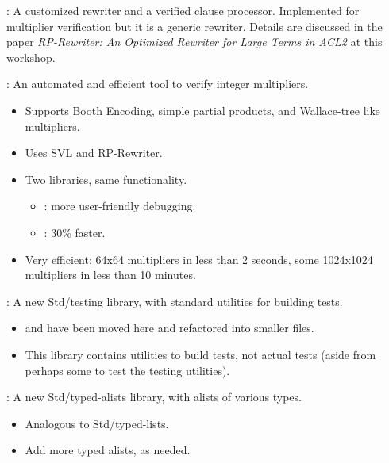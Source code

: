 
\begin{frame}

\newlibtitle

:
A customized rewriter and a verified
clause processor. Implemented for multiplier verification but it is a
generic rewriter. Details are discussed in the paper {\it RP-Rewriter: An
Optimized Rewriter for Large Terms in ACL2} at this workshop.

\separation

:
An automated and efficient tool to verify integer multipliers.
\begin{itemize}
\item
Supports Booth Encoding,
simple partial products,
and Wallace-tree like multipliers.
\item Uses SVL and RP-Rewriter.
\item Two libraries, same  functionality.
  \begin{itemize}
  \item {}: more  user-friendly debugging.
  \item{}: 30\% faster.
  \end{itemize}
\item  Very efficient:  64x64  multipliers  in less  than  2 seconds,  some
  1024x1024 multipliers in less than 10 minutes.
\end{itemize}

\end{frame}


\begin{frame}

\newlibtitle

:
A new Std/testing library, with standard utilities for building tests.
\begin{itemize}
\item
{} and 
have been moved here and refactored into smaller files.
\item
This library contains utilities to build tests,
not actual tests (aside from perhaps some to test the testing utilities).
\end{itemize}

\separation

:
A new Std/typed-alists library, with alists of various types.
\begin{itemize}
\item
Analogous to Std/typed-lists.
\item
Add more typed alists, as needed.
\end{itemize}

\end{frame}

